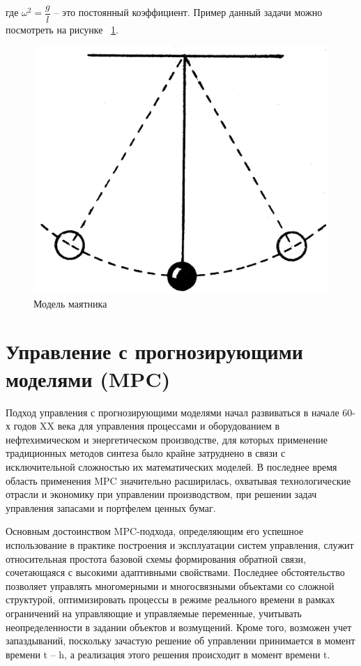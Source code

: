 где $\omega^2 = \dfrac{g}{l}$ -- это постоянный коэффициент. 
Пример данный задачи можно посмотреть на рисунке ~\ref{fig:pend}. 
\begin{figure}[h]
	\centering
	\includegraphics[scale=0.3]{mayat.png}
	\caption {Модель маятника}
	\label{fig:pend}
\end{figure}


\section{Управление с прогнозирующими моделями (MPC)}\label{1sec:mpc}


Подход управления с прогнозирующими моделями начал развиваться в начале 60-х годов XX века для управления процессами и оборудованием в нефтехимическом и энергетическом производстве, для которых применение традиционных методов синтеза было крайне затруднено в связи с исключительной сложностью их математических моделей. В последнее время область применения MPC значительно расширилась, охватывая технологические отрасли и экономику при управлении производством, при решении задач управления запасами и портфелем ценных бумаг.

Основным достоинством MPC-подхода, определяющим его успешное использование в практике построения и эксплуатации систем управления, служит относительная простота базовой схемы формирования обратной связи, сочетающаяся с высокими адаптивными свойствами. Последнее обстоятельство позволяет управлять многомерными и многосвязными объектами со сложной структурой, оптимизировать процессы в режиме реального времени в рамках ограничений на управляющие и управляемые переменные, учитывать неопределенности в задании объектов и возмущений. Кроме того, возможен учет запаздываний, поскольку зачастую решение об управлении принимается в момент времени t – h, а реализация этого решения происходит в момент времени t.

